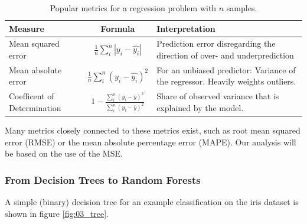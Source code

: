 \begin{table}
  \caption{Popular metrics for a regression problem with $n$ samples.}
  \begin{center}
    \begin{tabularx}{\textwidth}{l c X}
      Measure & Formula & Interpretation \\
      \hline
      Mean squared error & $\frac{1}{n}\sum_i^n |y_i-\hat{y_i}|$ & Prediction error disregarding the direction of over- and underprediction \\
      Mean absolute error & $\frac{1}{n}\sum_i^n (y_i-\hat{y_i})^2$ & For an unbiased predictor: Variance of the regressor. Heavily weights outliers. \\
      Coefficent of Determination & $1 - \frac{\sum_i^n (\bar{y_i}-\bar{y})^2}{\sum_i^n (y_i-\bar{y})^2}$ & Share of observed variance that is explained by the model.\\
    \end{tabularx}
  \end{center}
  \label{tab:regr_metrics}
\end{table}

Many metrics closely connected to these metrics exist, such as root mean squared error (RMSE)
or the mean absolute percentage error (MAPE).
Our analysis will be based on the use of the MSE.

\subsubsection{From Decision Trees to Random Forests}
A simple (binary) decision tree
for an example classification on the iris dataset
is shown in figure \ref{fig:03_tree}.

